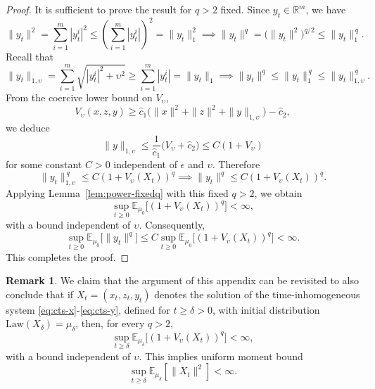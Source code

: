 \documentclass[11pt, a4paper,leqno]{amsart}
\theoremstyle{definition}
\newtheorem{remark}{Remark}[section]
\numberwithin{equation}{section}
\newcommand{\R}{\mathbb R}
\begin{document}
\begin{proof}
It is sufficient to prove the result for $q>2$ fixed. Since $y_t\in\R^m$, we have
\[
\|y_t\|^2=\sum_{i=1}^m |y_t^i|^2
\le \left(\sum_{i=1}^m |y_t^i|\right)^2
= \|y_t\|_1^2\implies
\|y_t\|^{q}
=\bigl(\|y_t\|^2\bigr)^{q/2}
\le \|y_t\|_1^{\,q}.
\]
Recall that
\[
\|y_t\|_{1,\upsilon}
=\sum_{i=1}^m \sqrt{|y_t^i|^2+\upsilon^2}
\ge \sum_{i=1}^m |y_t^i|
=\|y_t\|_1\implies
\|y_t\|^{q}
\le \|y_t\|_1^{\,q}
\le \|y_t\|_{1,\upsilon}^{\,q}.
\]
From the coercive lower bound on $V_\upsilon$,
\[
V_\upsilon(x,z,y)
\ge \hat c_1\bigl(\|x\|^2+\|z\|^2+\|y\|_{1,\upsilon}\bigr)-\hat c_2,
\]
we deduce
\[
\|y\|_{1,\upsilon}
\le \frac{1}{\hat c_1}\bigl(V_\upsilon+\hat c_2\bigr)
\le C(1+V_\upsilon)
\]
for some constant $C>0$ independent of $\epsilon$ and $\upsilon$.
Therefore
\[
\|y_t\|_{1,\upsilon}^{\,q}
\le C (1+V_\upsilon(X_t))^{q}\implies
\|y_t\|^{q}
\le C (1+V_\upsilon(X_t))^{q}.
\]
Applying Lemma~\ref{lem:power-fixedq} with this fixed $q>2$,
we obtain
\[
\sup_{t\ge0}
\mathbb E_{\mu_0}\bigl[(1+V_\upsilon(X_t))^{q}\bigr]
<\infty,
\]
with a bound independent of $\upsilon$.
Consequently,
\[
\sup_{t\ge0}
\mathbb E_{\mu_0}\bigl[\|y_t\|^{q}\bigr]
\le
C
\sup_{t\ge0}
\mathbb E_{\mu_0}\bigl[(1+V_\upsilon(X_t))^{q}\bigr]
<\infty.
\]
This completes the proof.
\end{proof}


\begin{remark}\label{Inhomo} We claim that the argument of this appendix can be revisited to also conclude that if \(X_t=(x_t,z_t,y_t)\) denotes the solution of the time-inhomogeneous system
\eqref{eq:cts-x}-\eqref{eq:cts-y}, defined for \(t\ge \delta>0\), with initial distribution
\(\mathrm{Law}(X_\delta)=\mu_\delta\), then, for every $q>2$,
\[
\sup_{t\ge\delta}
\mathbb E_{\mu_\delta}\bigl[(1+V_\upsilon(X_t))^{q}\bigr]
<\infty,
\]
with a bound independent of $\upsilon$. This implies uniform moment bound
\begin{equation*}
\sup_{t\ge \delta}\mathbb E_{\mu_\delta}[\|X_t\|^2]<\infty.
\end{equation*}
\end{remark}
\end{document}
